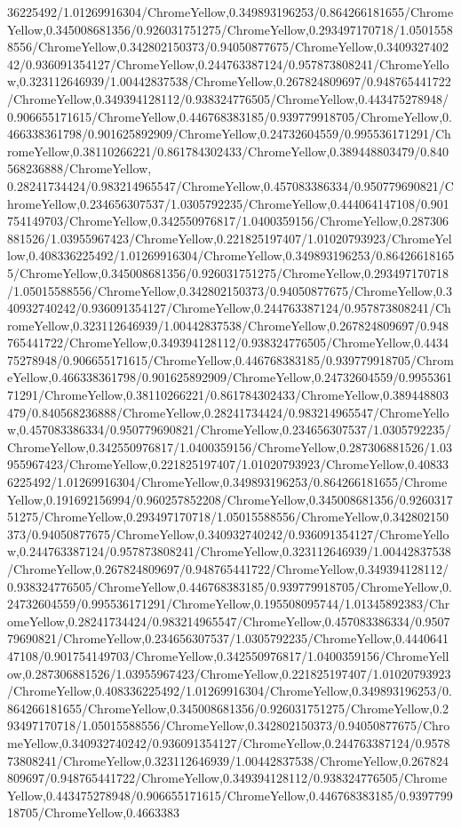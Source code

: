 {\begin{tikzternal}
{36225492/1.01269916304/ChromeYellow,0.349893196253/0.864266181655/ChromeYellow,0.345008681356/0.926031751275/ChromeYellow,0.293497170718/1.05015588556/ChromeYellow,0.342802150373/0.94050877675/ChromeYellow,0.340932740242/0.936091354127/ChromeYellow,0.244763387124/0.957873808241/ChromeYellow,0.323112646939/1.00442837538/ChromeYellow,0.267824809697/0.948765441722/ChromeYellow,0.349394128112/0.938324776505/ChromeYellow,0.443475278948/0.906655171615/ChromeYellow,0.446768383185/0.939779918705/ChromeYellow,0.466338361798/0.901625892909/ChromeYellow,0.24732604559/0.995536171291/ChromeYellow,0.38110266221/0.861784302433/ChromeYellow,0.389448803479/0.840568236888/ChromeYellow,
0.28241734424/0.983214965547/ChromeYellow,0.457083386334/0.950779690821/ChromeYellow,0.234656307537/1.0305792235/ChromeYellow,0.444064147108/0.901754149703/ChromeYellow,0.342550976817/1.0400359156/ChromeYellow,0.287306881526/1.03955967423/ChromeYellow,0.221825197407/1.01020793923/ChromeYellow,0.408336225492/1.01269916304/ChromeYellow,0.349893196253/0.864266181655/ChromeYellow,0.345008681356/0.926031751275/ChromeYellow,0.293497170718/1.05015588556/ChromeYellow,0.342802150373/0.94050877675/ChromeYellow,0.340932740242/0.936091354127/ChromeYellow,0.244763387124/0.957873808241/ChromeYellow,0.323112646939/1.00442837538/ChromeYellow,0.267824809697/0.948765441722/ChromeYellow,0.349394128112/0.938324776505/ChromeYellow,0.443475278948/0.906655171615/ChromeYellow,0.446768383185/0.939779918705/ChromeYellow,0.466338361798/0.901625892909/ChromeYellow,0.24732604559/0.995536171291/ChromeYellow,0.38110266221/0.861784302433/ChromeYellow,0.389448803479/0.840568236888/ChromeYellow,0.28241734424/0.983214965547/ChromeYellow,0.457083386334/0.950779690821/ChromeYellow,0.234656307537/1.0305792235/ChromeYellow,0.342550976817/1.0400359156/ChromeYellow,0.287306881526/1.03955967423/ChromeYellow,0.221825197407/1.01020793923/ChromeYellow,0.408336225492/1.01269916304/ChromeYellow,0.349893196253/0.864266181655/ChromeYellow,0.191692156994/0.960257852208/ChromeYellow,0.345008681356/0.926031751275/ChromeYellow,0.293497170718/1.05015588556/ChromeYellow,0.342802150373/0.94050877675/ChromeYellow,0.340932740242/0.936091354127/ChromeYellow,0.244763387124/0.957873808241/ChromeYellow,0.323112646939/1.00442837538/ChromeYellow,0.267824809697/0.948765441722/ChromeYellow,0.349394128112/0.938324776505/ChromeYellow,0.446768383185/0.939779918705/ChromeYellow,0.24732604559/0.995536171291/ChromeYellow,0.195508095744/1.01345892383/ChromeYellow,0.28241734424/0.983214965547/ChromeYellow,0.457083386334/0.950779690821/ChromeYellow,0.234656307537/1.0305792235/ChromeYellow,0.444064147108/0.901754149703/ChromeYellow,0.342550976817/1.0400359156/ChromeYellow,0.287306881526/1.03955967423/ChromeYellow,0.221825197407/1.01020793923/ChromeYellow,0.408336225492/1.01269916304/ChromeYellow,0.349893196253/0.864266181655/ChromeYellow,0.345008681356/0.926031751275/ChromeYellow,0.293497170718/1.05015588556/ChromeYellow,0.342802150373/0.94050877675/ChromeYellow,0.340932740242/0.936091354127/ChromeYellow,0.244763387124/0.957873808241/ChromeYellow,0.323112646939/1.00442837538/ChromeYellow,0.267824809697/0.948765441722/ChromeYellow,0.349394128112/0.938324776505/ChromeYellow,0.443475278948/0.906655171615/ChromeYellow,0.446768383185/0.939779918705/ChromeYellow,0.4663383}
\end{tikzternal}}
